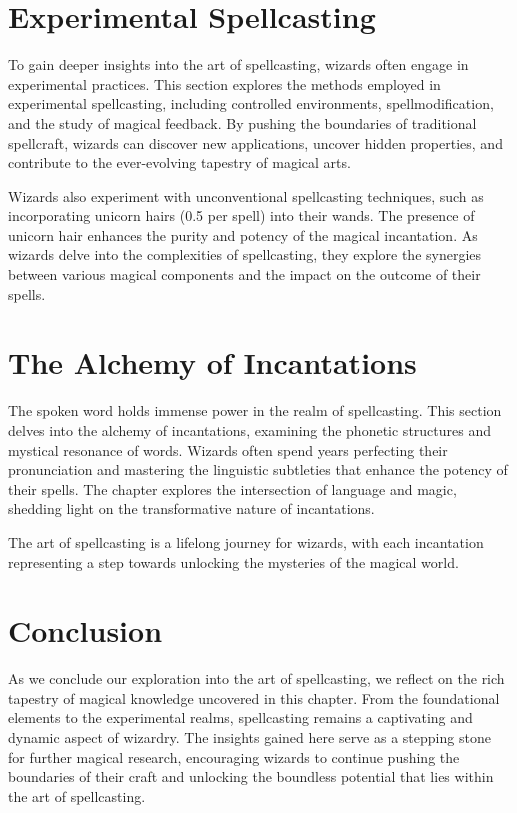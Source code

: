 \section{Experimental Spellcasting}
To gain deeper insights into the art of spellcasting, wizards often engage in experimental practices. This section explores the methods employed in experimental spellcasting, including controlled environments, \gls{spell}modification, and the study of magical feedback. By pushing the boundaries of traditional spellcraft, wizards can discover new applications, uncover hidden properties, and contribute to the ever-evolving tapestry of magical arts.

Wizards also experiment with unconventional spellcasting techniques, such as incorporating unicorn hairs (\SI{0.5}{\unicornhair} per spell) into their wands. The presence of unicorn hair enhances the purity and potency of the magical incantation. As wizards delve into the complexities of spellcasting, they explore the synergies between various magical components and the impact on the outcome of their spells.

\section{The Alchemy of Incantations}
The spoken word holds immense power in the realm of spellcasting. This section delves into the alchemy of incantations, examining the phonetic structures and mystical resonance of words. Wizards often spend years perfecting their pronunciation and mastering the linguistic subtleties that enhance the potency of their spells. The chapter explores the intersection of language and magic, shedding light on the transformative nature of incantations.

The art of spellcasting is a lifelong journey for wizards, with each incantation representing a step towards unlocking the mysteries of the magical world.

\section{Conclusion}
As we conclude our exploration into the art of spellcasting, we reflect on the rich tapestry of magical knowledge uncovered in this chapter. From the foundational elements to the experimental realms, spellcasting remains a captivating and dynamic aspect of wizardry. The insights gained here serve as a stepping stone for further magical research, encouraging wizards to continue pushing the boundaries of their craft and unlocking the boundless potential that lies within the art of spellcasting.


